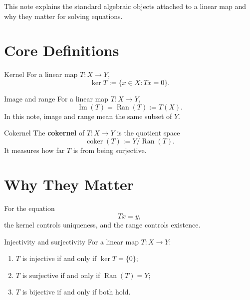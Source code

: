 \documentclass[header={Ancillary Note: Kernel And Range},notheorems]{study-note}
\begin{document}

\vspace{0.8em}

\begin{focusbox}
This note explains the standard algebraic objects attached to a linear map and why they matter for solving equations.
\end{focusbox}

\tableofcontents

\section{Core Definitions}

\begin{defbox}{Kernel}
For a linear map $T:X\to Y$,
\[
\ker T:=\{x\in X:Tx=0\}.
\]
\end{defbox}

\begin{defbox}{Image and range}
For a linear map $T:X\to Y$,
\[
\operatorname{Im}(T)=\operatorname{Ran}(T):=T(X).
\]
In this note, image and range mean the same subset of $Y$.
\end{defbox}

\begin{defbox}{Cokernel}
The \textbf{cokernel} of $T:X\to Y$ is the quotient space
\[
\operatorname{coker}(T):=Y/\operatorname{Ran}(T).
\]
It measures how far $T$ is from being surjective.
\end{defbox}

\section{Why They Matter}

\begin{focusbox}
For the equation
\[
Tx=y,
\]
the kernel controls uniqueness, and the range controls existence.
\end{focusbox}

\begin{thmbox}{Injectivity and surjectivity}
For a linear map $T:X\to Y$:
\begin{enumerate}
\item $T$ is injective if and only if $\ker T=\{0\}$;
\item $T$ is surjective if and only if $\operatorname{Ran}(T)=Y$;
\item $T$ is bijective if and only if both hold.
\end{enumerate}
\end{thmbox}
\end{document}
